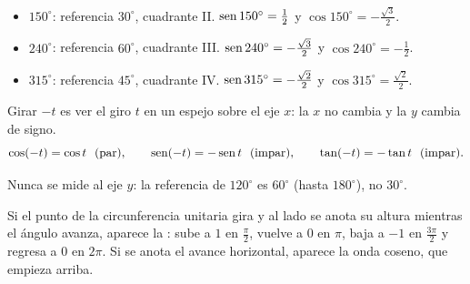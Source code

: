 \documentclass[11pt,a4paper]{article}
\let\nivelorig\nivel
\renewcommand{\nivel}[2]{\Needspace{8\baselineskip}\nivelorig{#1}{#2}}
\begin{document}
\begin{ejemplo}
\begin{itemize}
\item $150^\circ$: referencia $30^\circ$, cuadrante II. $\operatorname{sen}150^\circ=\tfrac12$ y $\cos150^\circ=-\tfrac{\sqrt3}{2}$.
\item $240^\circ$: referencia $60^\circ$, cuadrante III. $\operatorname{sen}240^\circ=-\tfrac{\sqrt3}{2}$ y $\cos240^\circ=-\tfrac12$.
\item $315^\circ$: referencia $45^\circ$, cuadrante IV. $\operatorname{sen}315^\circ=-\tfrac{\sqrt2}{2}$ y $\cos315^\circ=\tfrac{\sqrt2}{2}$.
\end{itemize}
\end{ejemplo}

\begin{propiedad}
Girar $-t$ es ver el giro $t$ en un espejo sobre el eje $x$: la $x$ no cambia y la $y$ cambia de signo.
\[ \cos(-t)=\cos t\ \ \text{(par)},\qquad \sen(-t)=-\sen t\ \ \text{(impar)},\qquad \tan(-t)=-\tan t\ \ \text{(impar)}. \]
\end{propiedad}

\begin{ojo}
Nunca se mide al eje $y$: la referencia de $120^\circ$ es $60^\circ$ (hasta $180^\circ$), no $30^\circ$.
\end{ojo}


Si el punto de la circunferencia unitaria gira y al lado se anota su altura mientras el ángulo avanza, aparece la
: sube a $1$ en $\tfrac{\pi}{2}$, vuelve a $0$ en $\pi$, baja a $-1$ en $\tfrac{3\pi}{2}$ y regresa a
$0$ en $2\pi$. Si se anota el avance horizontal, aparece la onda coseno, que empieza arriba.

\begin{figura}[Las gráficas de $y=\sen x$ y $y=\cos x$ en una vuelta. Tienen la misma forma: el coseno es el seno adelantado $\tfrac{\pi}{2}$.]
\end{figura}
\end{document}
